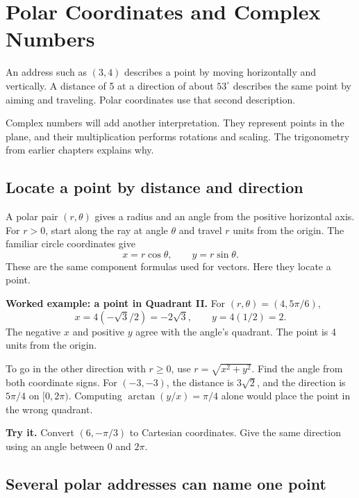\section{Polar Coordinates and Complex Numbers}
An address such as \((3,4)\) describes a point by moving horizontally and vertically. A distance of 5 at a direction of about \(53^\circ\) describes the same point by aiming and traveling. Polar coordinates use that second description.

Complex numbers will add another interpretation. They represent points in the plane, and their multiplication performs rotations and scaling. The trigonometry from earlier chapters explains why.

\hypertarget{m7-locate-a-point-by-distance-and-direction}{%
\subsection{Locate a point by distance and direction}\label{m7-locate-a-point-by-distance-and-direction}}

A polar pair \((r,\theta)\) gives a radius and an angle from the positive horizontal axis. For \(r>0\), start along the ray at angle \(\theta\) and travel \(r\) units from the origin. The familiar circle coordinates give \[
x=r\cos\theta,\qquad y=r\sin\theta.
\] These are the same component formulas used for vectors. Here they locate a point.

\textbf{Worked example: a point in Quadrant II.} For \((r,\theta)=(4,5\pi/6)\), \[
x=4(-\sqrt3/2)=-2\sqrt3,\qquad y=4(1/2)=2.
\] The negative \(x\) and positive \(y\) agree with the angle's quadrant. The point is 4 units from the origin.

To go in the other direction with \(r\ge0\), use \(r=\sqrt{x^2+y^2}\). Find the angle from both coordinate signs. For \((-3,-3)\), the distance is \(3\sqrt2\), and the direction is \(5\pi/4\) on \([0,2\pi)\). Computing \(\arctan(y/x)=\pi/4\) alone would place the point in the wrong quadrant.

\textbf{Try it.} Convert \((6,-\pi/3)\) to Cartesian coordinates. Give the same direction using an angle between 0 and \(2\pi\).

\hypertarget{m7-several-polar-addresses-can-name-one-point}{%
\subsection{Several polar addresses can name one point}\label{m7-several-polar-addresses-can-name-one-point}}

